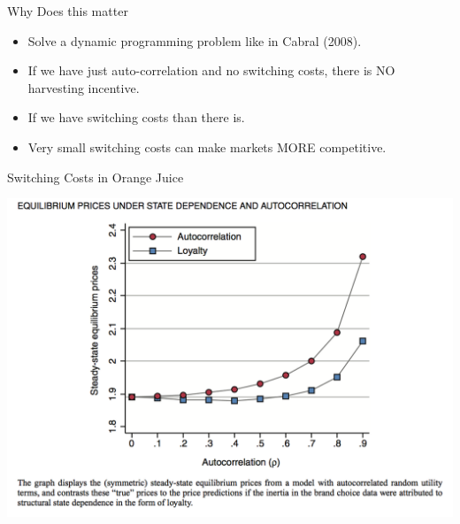 \documentclass[xcolor=pdftex,dvipsnames,table,mathserif]{beamer}
\begin{document}
\begin{frame}{Why Does this matter}
\begin{itemize}
\item Solve a dynamic programming problem like in Cabral (2008).
\item If we have just auto-correlation and no switching costs, there is NO harvesting incentive.
\item If we have switching costs than there is.
\item Very small switching costs can make markets MORE competitive.
\end{itemize}

\end{frame}


\begin{frame}{Switching Costs in Orange Juice}
\begin{center}
\includegraphics[scale=0.33]{resources/OJ_F12.png}
\end{center}
\end{frame}
\end{document}
